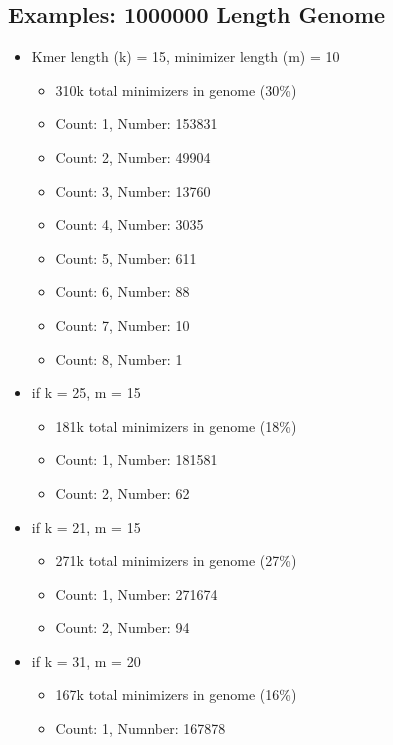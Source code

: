 \documentclass[10pt]{article}
\begin{document}
\subsection*{Examples: 1000000 Length Genome}
\begin{itemize}
    \item Kmer length (k) = 15, minimizer length (m) = 10
    \begin{itemize}
        \item 310k total minimizers in genome (30\%)
        \item Count: 1, Number: 153831
        \item Count: 2, Number: 49904
        \item Count: 3, Number: 13760
        \item Count: 4, Number: 3035
        \item Count: 5, Number: 611
        \item Count: 6, Number: 88
        \item Count: 7, Number: 10
        \item Count: 8, Number: 1
    \end{itemize}
    \item if k = 25, m = 15
    \begin{itemize}
        \item 181k total minimizers in genome (18\%)
        \item Count: 1, Number: 181581
        \item Count: 2, Number: 62
    \end{itemize}
    \item if k = 21, m = 15
    \begin{itemize}
        \item 271k total minimizers in genome (27\%)
        \item Count: 1, Number: 271674
        \item Count: 2, Number: 94
    \end{itemize}
    \item if k = 31, m = 20
    \begin{itemize}
        \item 167k total minimizers in genome (16\%)
        \item Count: 1, Numnber: 167878
    \end{itemize}
\end{itemize}
\end{document}
